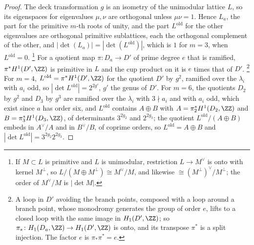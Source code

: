\begin{proof}
The deck transformation $g$ is an isometry of the unimodular lattice $L$, so
its eigenspaces for eigenvalues $\mu,\nu$ are orthogonal unless $\mu\nu=1$.
Hence $L_{a}$, the part for the primitive $m$-th roots of unity, and the
part $L^{\mathrm{old}}$ for the other eigenvalues are orthogonal primitive
sublattices, each the orthogonal complement of the other, and
$|\det(L_{a})|=|\det(L^{\mathrm{old}})|$, which is $1$ for $m=3$, when
$L^{\mathrm{old}}=0$.%
\footnote{If $M\subset L$ is primitive and $L$ is unimodular, restriction
$L\to M^{\vee}$ is onto with kernel $M^{\perp}$, so $L/(M\oplus M^{\perp})\cong
M^{\vee}/M$, and likewise $\cong(M^{\perp})^{\vee}/M^{\perp}$; the order of
$M^{\vee}/M$ is $|\det M|$.} For a quotient map $\pi\colon D_{a}\to D'$ of
prime degree $e$ that is ramified, $\pi^{*}H^{1}(D',\ZZ)$ is primitive in $L$
and the cup product on it is $e$ times that of $D'$.%
\footnote{A loop in $D'$ avoiding the branch points, composed with a loop
around a branch point, whose monodromy generates the group of order $e$,
lifts to a closed loop with the same image in $H_{1}(D',\ZZ)$; so
$\pi_{*}\colon H_{1}(D_{a},\ZZ)\to H_{1}(D',\ZZ)$ is onto, and its transpose
$\pi^{*}$ is a split injection. The factor $e$ is $\pi_{*}\pi^{*}=e$.} For
$m=4$, $L^{\mathrm{old}}=\pi^{*}H^{1}(D',\ZZ)$ for the quotient $D'$ by $g^{2}$,
ramified over the $\lambda_{i}$ with $a_{i}$ odd, so
$|\det L^{\mathrm{old}}|=2^{2g'}$, $g'$ the genus of $D'$. For $m=6$, the
quotients $D_{2}$ by $g^{2}$ and $D_{3}$ by $g^{3}$ are ramified over the
$\lambda_{i}$ with $3\nmid a_{i}$ and with $a_{i}$ odd, which exist since $a$
has order six, and $L^{\mathrm{old}}$ contains $A\oplus B$ with
$A=\pi_{2}^{*}H^{1}(D_{2},\ZZ)$ and $B=\pi_{3}^{*}H^{1}(D_{3},\ZZ)$, of determinants
$3^{2g_{2}}$ and $2^{2g_{3}}$; the quotient $L^{\mathrm{old}}/(A\oplus B)$ embeds in
$A^{\vee}/A$ and in $B^{\vee}/B$, of coprime orders, so $L^{\mathrm{old}}=A\oplus B$
and $|\det L^{\mathrm{old}}|=3^{2g_{2}}2^{2g_{3}}$.


\end{proof}
